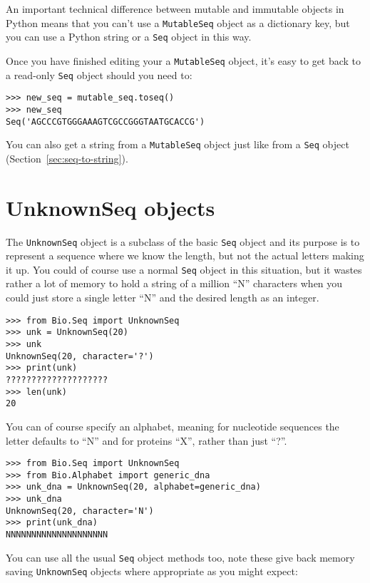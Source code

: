 {An important technical difference between mutable and immutable objects in Python means that you can't use a \verb|MutableSeq| object as a dictionary key, but you can use a Python string or a \verb|Seq| object in this way.

Once you have finished editing your a \verb|MutableSeq| object, it's easy to get back to a read-only \verb|Seq| object should you need to:

\begin{verbatim}
>>> new_seq = mutable_seq.toseq()
>>> new_seq
Seq('AGCCCGTGGGAAAGTCGCCGGGTAATGCACCG')
\end{verbatim}

You can also get a string from a \verb|MutableSeq| object just like from a \verb|Seq| object (Section~\ref{sec:seq-to-string}).

\section{UnknownSeq objects}
The \verb|UnknownSeq| object is a subclass of the basic \verb|Seq| object
and its purpose is to represent a
sequence where we know the length, but not the actual letters making it up.
You could of course use a normal \verb|Seq| object in this situation, but it wastes
rather a lot of memory to hold a string of a million ``N'' characters when you could
just store a single letter ``N'' and the desired length as an integer.

\begin{verbatim}
>>> from Bio.Seq import UnknownSeq
>>> unk = UnknownSeq(20)
>>> unk
UnknownSeq(20, character='?')
>>> print(unk)
????????????????????
>>> len(unk)
20
\end{verbatim}

You can of course specify an alphabet, meaning for nucleotide sequences
the letter defaults to ``N'' and for proteins ``X'', rather than just ``?''.

\begin{verbatim}
>>> from Bio.Seq import UnknownSeq
>>> from Bio.Alphabet import generic_dna
>>> unk_dna = UnknownSeq(20, alphabet=generic_dna)
>>> unk_dna
UnknownSeq(20, character='N')
>>> print(unk_dna)
NNNNNNNNNNNNNNNNNNNN
\end{verbatim}

You can use all the usual \verb|Seq| object methods too, note these give back
memory saving \verb|UnknownSeq| objects where appropriate as you might expect:

}
